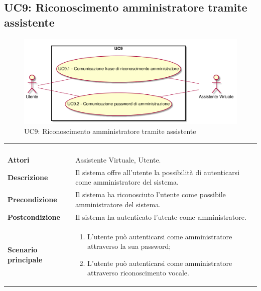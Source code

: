 \subsection{UC9: Riconoscimento amministratore tramite assistente}
\label{UC9}
\begin{figure}[h]
\centering
\includegraphics[width=\textwidth,height=\textheight,keepaspectratio]{images/UseCaseUC9.png}
\caption{UC9: Riconoscimento amministratore tramite assistente}
\end{figure}
\begin{longtable}{l|p{10cm}}
\rowcolor[gray]{0.8} \multicolumn{2}{c}{} \\
\rowcolor[gray]{0.8} \multicolumn{2}{c}{\textbf{UC9 - Riconoscimento amministratore tramite assistente}} \\
\rowcolor[gray]{0.8} \multicolumn{2}{c}{} \\
\hline
&\\
\textbf{Attori} & Assistente Virtuale, Utente.\\[7pt]
\textbf{Descrizione} & Il sistema offre all'utente la possibilità di autenticarsi come amministratore del sistema.\\[7pt]
\textbf{Precondizione} & Il sistema ha riconosciuto l'utente come possibile amministratore del sistema.\\[7pt]
\textbf{Postcondizione} & Il sistema ha autenticato l'utente come amministratore. \\[7pt]
\textbf{Scenario principale} &\begin{enumerate}
\item  L'utente può autenticarsi come amministratore attraverso la sua password;
\item  L'utente può autenticarsi come amministratore attraverso riconoscimento vocale.
\end{enumerate}
\\[7pt]\hline
\end{longtable}


